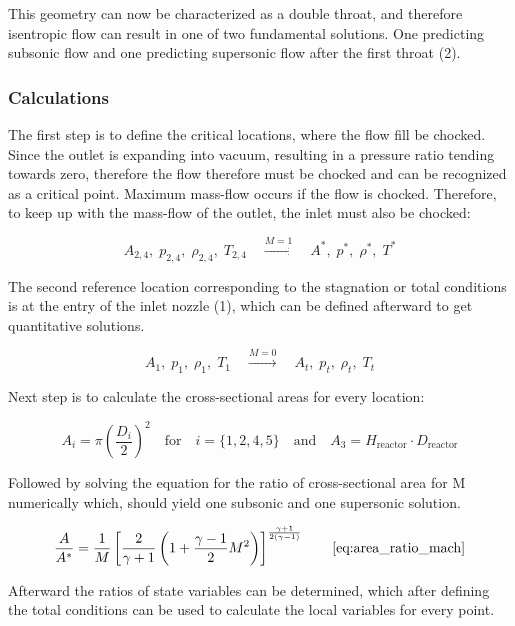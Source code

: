 This geometry can now be characterized as a double throat, and therefore isentropic flow can result in one of two fundamental solutions.
One predicting subsonic flow and one predicting supersonic flow after the first throat (2).
\cite{SALAS1986193}
\cite{EMMONS1958}

\subsubsection*{Calculations}
The first step is to define the critical locations, where the flow fill be chocked.
Since the outlet is expanding into vacuum, resulting in a pressure ratio tending towards zero, therefore the flow therefore must be chocked and can be recognized as a critical point.
Maximum mass-flow occurs if the flow is chocked. Therefore, to keep up with the mass-flow of the outlet, the inlet must also be chocked: 

$$
	A_{2,4},\;p_{2,4},\;\rho_{2,4},\;T_{2,4}\quad\xrightarrow{M=1}\quad A^*,\;p^*,\;\rho^*,\;T^*
$$

The second reference location corresponding to the stagnation or total conditions is at the entry of the inlet nozzle (1), which can be defined afterward to get quantitative solutions.

$$
	A_1,\;p_1,\;\rho_1,\;T_1\quad\xrightarrow{M=0}\quad A_t,\;p_t,\;\rho_t,\;T_t
$$

Next step is to calculate the cross-sectional areas for every location:

$$
	A_i = \pi \left(\frac{D_i}{2}\right)^2
		\quad \text{for} \quad
	i=\{1,2,4,5\}
		\quad \text{and} \quad
	A_3 = H_\text{reactor}\cdot D_\text{reactor}
$$

Followed by solving the equation for the ratio of cross-sectional area for M numerically which, should yield one subsonic and one supersonic solution.

$$
	\frac{A}{A^*} = \frac{1}{M} \left[ \frac{2}{\gamma + 1} \left( 1 + \frac{\gamma - 1}{2} M^2 \right) \right]^{\frac{\gamma + 1}{2(\gamma - 1)}}
	\qquad \eqref{eq:area_ratio_mach}
$$

Afterward the ratios of state variables can be determined, which after defining the total conditions can be used to calculate the local variables for every point.
\cite{hall_isentropic_nodate}

